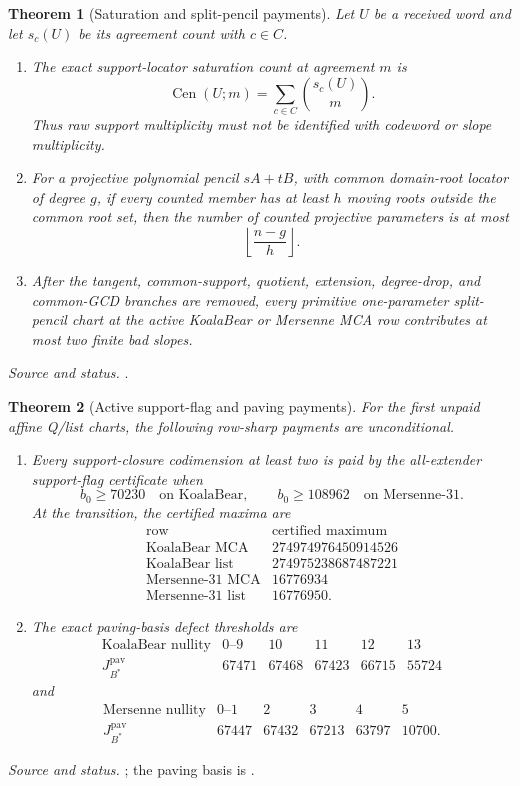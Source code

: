 \documentclass[11pt,a4paper]{amsart}
\numberwithin{equation}{section}
\newtheorem{theorem}{Theorem}[section]
\theoremstyle{remark}
\newcommand{\floor}[1]{\left\lfloor#1\right\rfloor}
\newcommand{\source}[1]{\par\smallskip\noindent\textit{Source and status.} #1\par}
\begin{document}
\begin{theorem}[Saturation and split-pencil payments]\label{thm:saturation-pencil}
Let $U$ be a received word and let $s_c(U)$ be its agreement count with $c\in C$.
\begin{enumerate}[label=\textup{(\roman*)},leftmargin=*]
\item The exact support-locator saturation count at agreement $m$ is
\[
 \operatorname{Cen}(U;m)=\sum_{c\in C}\binom{s_c(U)}m.
\]
Thus raw support multiplicity must not be identified with codeword or slope multiplicity.
\item For a projective polynomial pencil $sA+tB$, with common domain-root locator of degree $g$, if every counted member has at least $h$ moving roots outside the common root set, then the number of counted projective parameters is at most
\[
 \floor{\frac{n-g}{h}}.
\]
\item After the tangent, common-support, quotient, extension, degree-drop, and common-GCD branches are removed, every primitive one-parameter split-pencil chart at the active KoalaBear or Mersenne MCA row contributes at most two finite bad slopes.
\end{enumerate}
\end{theorem}
\source{\cite[Saturation identity and moving-root split-pencil theorem]{ChoGF26}.}

\begin{theorem}[Active support-flag and paving payments]\label{thm:active-payments}
For the first unpaid affine Q/list charts, the following row-sharp payments are unconditional.
\begin{enumerate}[label=\textup{(\roman*)},leftmargin=*]
\item Every support-closure codimension at least two is paid by the all-extender support-flag certificate when
\[
 b_0\ge70230\quad\text{on KoalaBear},
 \qquad
 b_0\ge108962\quad\text{on Mersenne-31}.
\]
At the transition, the certified maxima are
\[
\begin{array}{c|r}
\text{row}&\text{certified maximum}\\ \hline
\text{KoalaBear MCA}&274974976450914526\\
\text{KoalaBear list}&274975238687487221\\
\text{Mersenne-31 MCA}&16776934\\
\text{Mersenne-31 list}&16776950.
\end{array}
\]
\item The exact paving-basis defect thresholds are
\[
\begin{array}{c|rrrrr}
\text{KoalaBear nullity}&0\text{--}9&10&11&12&13\\ \hline
J_{B^*}^{\mathrm{pav}}&67471&67468&67423&66715&55724
\end{array}
\]
and
\[
\begin{array}{c|rrrrr}
\text{Mersenne nullity}&0\text{--}1&2&3&4&5\\ \hline
J_{B^*}^{\mathrm{pav}}&67447&67432&67213&63797&10700.
\end{array}
\]
\end{enumerate}
\end{theorem}
\source{\cite[Active higher-codimension flag payment and exact paving-basis MCA payments]{ChoGF26}; the paving basis is \cite{ChoShort26}.}
\end{document}
